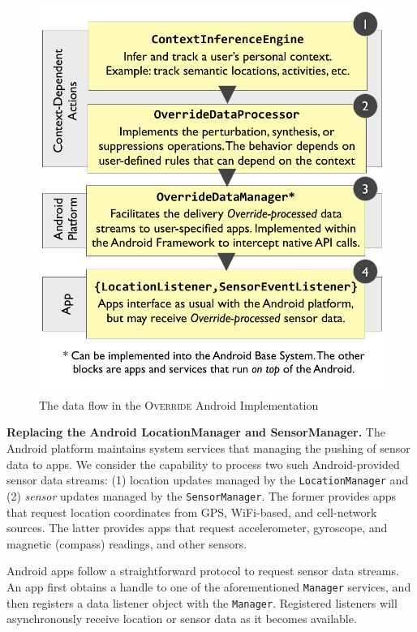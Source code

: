 \documentclass[10pt]{sensys-proc}
\begin{document}
\begin{figure}
\includegraphics[width=\columnwidth]{../figures/android_impl4.pdf}
\caption{The data flow in the \textsc{Override} Android Implementation}
\label{fig:android_impl}
\end{figure}

\textbf{Replacing the Android LocationManager and SensorManager.} The Android platform maintains system services that managing the pushing of sensor data to apps. We consider the capability to process two such Android-provided sensor data streams: (1) location updates managed by the \texttt{LocationManager} and (2) \emph{sensor} updates managed by the \texttt{SensorManager}. The former provides apps that request location coordinates from GPS, WiFi-based, and cell-network sources. The latter provides apps that request accelerometer, gyroscope, and magnetic (compass) readings, and other sensors.

Android apps follow a straightforward protocol to request sensor data streams. An app first obtains a handle to one of the aforementioned \texttt{Manager} services, and then registers a data listener object with the \texttt{Manager}. Registered listeners will asynchronously receive location or sensor data as it becomes available.
\end{document}
